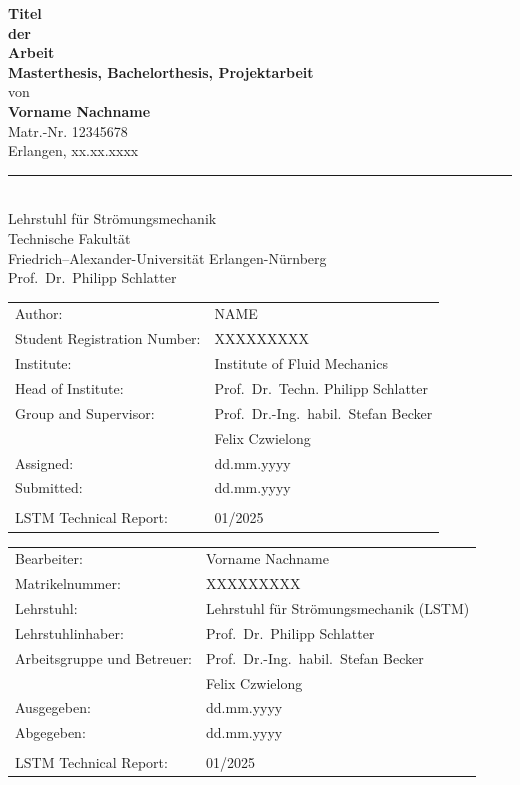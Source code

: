 \documentclass[
 	11pt,                 				%
  	notitlepage,          				%
  	twoside, 			   				%
 	bibliography=totoc,
  	listof=totoc,
  	headsepline,         				%
  	footsepline,         				%
  cleardoublepage=empty,				%
  numbers=noenddot,
]{scrreprt}
\begin{document}
\begin{titlepage}
\begin{center}
		\LARGE {\textbf{Titel \\ der \\ Arbeit}} \\ [25mm]
		\huge {\textbf{Masterthesis, Bachelorthesis, Projektarbeit}} \\ [14mm]
		von \\ [2mm]
		\LARGE \textbf{Vorname Nachname}\\[5mm]
		\LARGE Matr.-Nr. 12345678\\[5mm]
		\LARGE Erlangen, xx.xx.xxxx\\
		\vfill
		\rule{15cm}{0.02mm}\\
		\Large Lehrstuhl für Strömungsmechanik\\
		Technische Fakultät\\
		Friedrich--Alexander-Universität Erlangen-Nürnberg\\
		Prof.\ Dr.\ Philipp Schlatter\\
		\fi
  		\end{center}
\end{titlepage}


  	\thispagestyle{empty}	
	\cleardoublepage
	
	\ifenglish
	
	\begin{tabular}[H]{ll}
	  Author:& NAME \\
	  Student Registration Number: & XXXXXXXXX \\
	  Institute: & Institute of Fluid Mechanics\\
	  Head of Institute: & Prof.\ Dr.\ Techn. Philipp Schlatter\\ 
	  Group and Supervisor:& Prof.\ Dr.-Ing.\ habil.\ Stefan Becker \\
	  & Felix Czwielong \\		
	  Assigned: & dd.mm.yyyy \\
	  Submitted: & dd.mm.yyyy \\
	  \\
	  LSTM Technical Report: & 01/2025
	\end{tabular}	

	\else

	\begin{tabular}[H]{ll}
	Bearbeiter:& Vorname Nachname \\
	Matrikelnummer: & XXXXXXXXX \\
	Lehrstuhl: & Lehrstuhl für Strömungsmechanik (LSTM) \\
	Lehrstuhlinhaber: & Prof.\ Dr.\ Philipp Schlatter\\ 
	Arbeitsgruppe und Betreuer:& Prof.\ Dr.-Ing.\ habil.\ Stefan Becker \\
	& Felix Czwielong\\		
	Ausgegeben: & dd.mm.yyyy \\
	Abgegeben: & dd.mm.yyyy \\
	\\
	LSTM Technical Report: & 01/2025
	\end{tabular}
	
\end{document}

